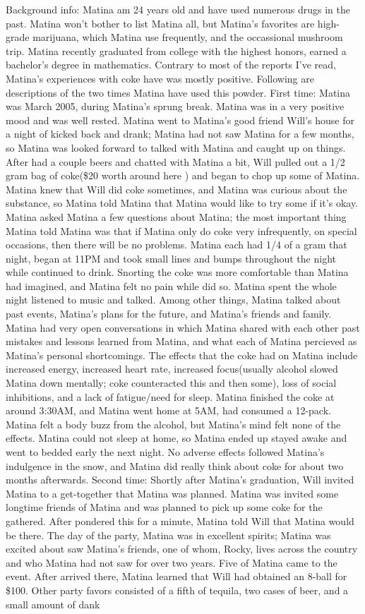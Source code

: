 \documentclass[12pt]{book}
\begin{document}
Background info: Matina am 24 years old and have used numerous drugs in the past. Matina won't bother to list Matina all, but Matina's favorites are high-grade marijuana, which Matina use frequently, and the occassional mushroom trip. Matina recently graduated from college with the highest honors, earned a bachelor's degree in mathematics. Contrary to most of the reports I've read, Matina's experiences with coke have was mostly positive. Following are descriptions of the two times Matina have used this powder. First time: Matina was March 2005, during Matina's sprung break. Matina was in a very positive mood and was well rested. Matina went to Matina's good friend Will's house for a night of kicked back and drank; Matina had not saw Matina for a few months, so Matina was looked forward to talked with Matina and caught up on things. After had a couple beers and chatted with Matina a bit, Will pulled out a 1/2 gram bag of coke(\$20 worth around here ) and began to chop up some of Matina. Matina knew that Will did coke sometimes, and Matina was curious about the substance, so Matina told Matina that Matina would like to try some if it's okay. Matina asked Matina a few questions about Matina; the most important thing Matina told Matina was that if Matina only do coke very infrequently, on special occasions, then there will be no problems. Matina each had 1/4 of a gram that night, began at 11PM and took small lines and bumps throughout the night while continued to drink. Snorting the coke was more comfortable than Matina had imagined, and Matina felt no pain while did so. Matina spent the whole night listened to music and talked. Among other things, Matina talked about past events, Matina's plans for the future, and Matina's friends and family. Matina had very open conversations in which Matina shared with each other past mistakes and lessons learned from Matina, and what each of Matina percieved as Matina's personal shortcomings. The effects that the coke had on Matina include increased energy, increased heart rate, increased focus(usually alcohol slowed Matina down mentally; coke counteracted this and then some), loss of social inhibitions, and a lack of fatigue/need for sleep. Matina finished the coke at around 3:30AM, and Matina went home at 5AM, had consumed a 12-pack. Matina felt a body buzz from the alcohol, but Matina's mind felt none of the effects. Matina could not sleep at home, so Matina ended up stayed awake and went to bedded early the next night. No adverse effects followed Matina's indulgence in the snow, and Matina did really think about coke for about two months afterwards. Second time: Shortly after Matina's graduation, Will invited Matina to a get-together that Matina was planned. Matina was invited some longtime friends of Matina and was planned to pick up some coke for the gathered. After pondered this for a minute, Matina told Will that Matina would be there. The day of the party, Matina was in excellent spirits; Matina was excited about saw Matina's friends, one of whom, Rocky, lives across the country and who Matina had not saw for over two years. Five of Matina came to the event. After arrived there, Matina learned that Will had obtained an 8-ball for \$100. Other party favors consisted of a fifth of tequila, two cases of beer, and a small amount of dank 
\end{document}
